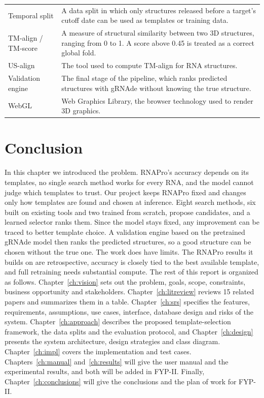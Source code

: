 \documentclass{FastFyp}
\begin{document}
\begin{longtable}{p{} p{}}
Temporal split & A data split in which only structures released before a target's cutoff date can be used as templates or training data.\\
TM-align / TM-score & A measure of structural similarity between two 3D structures, ranging from 0 to 1. A score above 0.45 is treated as a correct global fold.\\
US-align & The tool used to compute TM-align for RNA structures.\\
Validation engine & The final stage of the pipeline, which ranks predicted structures with gRNAde without knowing the true structure.\\
WebGL & Web Graphics Library, the browser technology used to render 3D graphics.\\
\hline
\end{longtable}

\section{Conclusion}
In this chapter we introduced the problem. RNAPro's accuracy depends on its templates, no single search method works for every RNA, and the model cannot judge which templates to trust. Our project keeps RNAPro fixed and changes only how templates are found and chosen at inference. Eight search methods, six built on existing tools and two trained from scratch, propose candidates, and a learned selector ranks them. Since the model stays fixed, any improvement can be traced to better template choice. A validation engine based on the pretrained gRNAde model then ranks the predicted structures, so a good structure can be chosen without the true one. The work does have limits. The RNAPro results it builds on are retrospective, accuracy is closely tied to the best available template, and full retraining needs substantial compute. The rest of this report is organized as follows. Chapter~\ref{ch:vision} sets out the problem, goals, scope, constraints, business opportunity and stakeholders. Chapter~\ref{ch:litreview} reviews 15 related papers and summarizes them in a table. Chapter~\ref{ch:srs} specifies the features, requirements, assumptions, use cases, interface, database design and risks of the system. Chapter~\ref{ch:approach} describes the proposed template-selection framework, the data splits and the evaluation protocol, and Chapter~\ref{ch:design} presents the system architecture, design strategies and class diagram. Chapter~\ref{ch:impl} covers the implementation and test cases. Chapters~\ref{ch:manual} and~\ref{ch:results} will give the user manual and the experimental results, and both will be added in FYP-II. Finally, Chapter~\ref{ch:conclusions} will give the conclusions and the plan of work for FYP-II.
\end{document}
